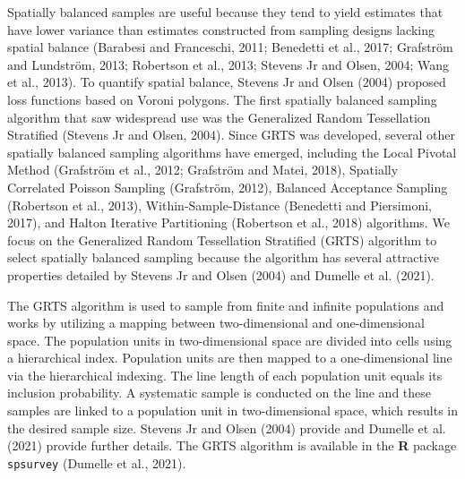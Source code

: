\documentclass[]{elsarticle} %
\begin{document}
Spatially balanced samples are useful because they tend to yield
estimates that have lower variance than estimates constructed from
sampling designs lacking spatial balance (Barabesi and Franceschi, 2011;
Benedetti et al., 2017; Grafström and Lundström, 2013; Robertson et al.,
2013; Stevens Jr and Olsen, 2004; Wang et al., 2013). To quantify
spatial balance, Stevens Jr and Olsen (2004) proposed loss functions
based on Voroni polygons. The first spatially balanced sampling
algorithm that saw widespread use was the Generalized Random
Tessellation Stratified (Stevens Jr and Olsen, 2004). Since GRTS was
developed, several other spatially balanced sampling algorithms have
emerged, including the Local Pivotal Method (Grafström et al., 2012;
Grafström and Matei, 2018), Spatially Correlated Poisson Sampling
(Grafström, 2012), Balanced Acceptance Sampling (Robertson et al.,
2013), Within-Sample-Distance (Benedetti and Piersimoni, 2017), and
Halton Iterative Partitioning (Robertson et al., 2018) algorithms. We
focus on the Generalized Random Tessellation Stratified (GRTS) algorithm
to select spatially balanced sampling because the algorithm has several
attractive properties detailed by Stevens Jr and Olsen (2004) and
Dumelle et al. (2021).

The GRTS algorithm is used to sample from finite and infinite
populations and works by utilizing a mapping between two-dimensional and
one-dimensional space. The population units in two-dimensional space are
divided into cells using a hierarchical index. Population units are then
mapped to a one-dimensional line via the hierarchical indexing. The line
length of each population unit equals its inclusion probability. A
systematic sample is conducted on the line and these samples are linked
to a population unit in two-dimensional space, which results in the
desired sample size. Stevens Jr and Olsen (2004) provide and Dumelle et
al. (2021) provide further details. The GRTS algorithm is available in
the \textbf{\textsf{R}} package \texttt{spsurvey} (Dumelle et al.,
2021).
\end{document}
